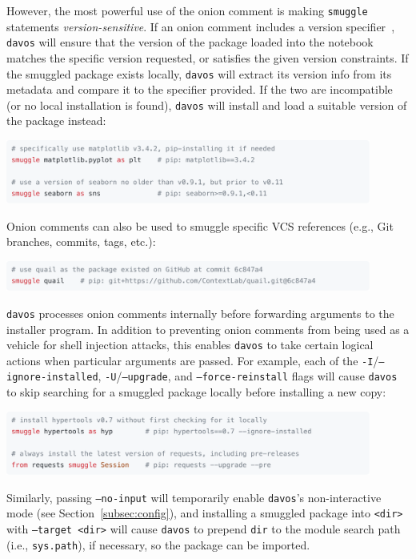 \documentclass[preprint,12pt,a4paper]{elsarticle}
\begin{document}
However, the most powerful use of the onion comment is making \texttt{smuggle} statements \textit{version-sensitive}. If an onion comment includes a version specifier~\cite{CoghStuf13}, \texttt{davos} will ensure that the version of the package loaded into the notebook matches the specific version requested, or satisfies the given version constraints. If the smuggled package exists locally, \texttt{davos} will extract its version info from its metadata and compare it to the specifier provided. If the two are incompatible (or no local installation is found), \texttt{davos} will install and load a suitable version of the package instead:
\begin{center}
\includegraphics[width=0.9\textwidth]{figs/snippet3}
\end{center}
Onion comments can also be used to smuggle specific VCS references (e.g., Git~\cite{TorvHama05}  branches, commits, tags, etc.):
\begin{center}
\includegraphics[width=0.9\textwidth]{figs/snippet4}
\end{center}
\texttt{davos} processes onion comments internally before forwarding arguments to the installer program. In addition to preventing onion comments from being used as a vehicle for shell injection attacks, this enables \texttt{davos} to take certain logical actions when particular arguments are passed. For example, each of the \mbox{\texttt{-I}/\texttt{--ignore-installed}}, \texttt{-U}/\texttt{--upgrade}, and \texttt{--force-reinstall} flags will cause \texttt{davos} to skip searching for a smuggled package locally before installing a new copy:
\begin{center}
\includegraphics[width=0.9\textwidth]{figs/snippet5}
\end{center}
Similarly, passing \texttt{--no-input} will temporarily enable \texttt{davos}'s non-interactive mode (see Section~\ref{subsec:config}), and installing a smuggled package into \texttt{<dir>} with \texttt{--target <dir>} will cause \texttt{davos} to prepend \texttt{dir} to the module search path (i.e., \texttt{sys.path}), if necessary, so the package can be imported.
\end{document}

